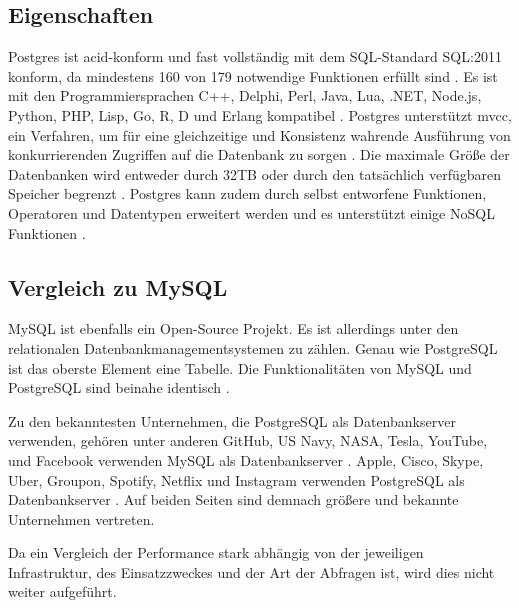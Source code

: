 \subsection{Eigenschaften}
Postgres ist \gls{acid}-konform und fast vollständig mit dem SQL-Standard SQL:2011 konform, da mindestens 160 von 179 notwendige Funktionen erfüllt sind \cite{postgres-about}.
Es ist mit den Programmiersprachen C++, Delphi, Perl, Java, Lua, .NET, Node.js, Python, PHP, Lisp, Go, R, D und Erlang kompatibel \cite{postgres-mysql-comparison}.
Postgres unterstützt \gls{mvcc}, ein Verfahren, um für eine gleichzeitige und Konsistenz wahrende Ausführung von konkurrierenden Zugriffen auf die Datenbank zu sorgen \cite{postgres-about}. Die maximale Größe der Datenbanken wird entweder durch 32TB oder durch den tatsächlich verfügbaren Speicher begrenzt \cite{postgres-about}. Postgres kann zudem durch selbst entworfene Funktionen, Operatoren und Datentypen erweitert werden und es unterstützt einige NoSQL Funktionen \cite{postgres-about}.

\subsection{Vergleich zu MySQL}
MySQL ist ebenfalls ein Open-Source Projekt. Es ist allerdings unter den relationalen Datenbankmanagementsystemen zu zählen. Genau wie PostgreSQL ist das oberste Element eine Tabelle. Die Funktionalitäten von MySQL und PostgreSQL sind beinahe identisch \cite{postgres-mysql-comparison}.

Zu den bekanntesten Unternehmen, die PostgreSQL als Datenbankserver verwenden, gehören unter anderen GitHub, US Navy, NASA, Tesla, YouTube, und Facebook verwenden MySQL als Datenbankserver \cite{mysql-companies}.
Apple, Cisco, Skype, Uber, Groupon, Spotify, Netflix und Instagram verwenden PostgreSQL als Datenbankserver \cite{postgres-companies}.
Auf beiden Seiten sind demnach größere und bekannte Unternehmen vertreten.

Da ein Vergleich der Performance stark abhängig von der jeweiligen Infrastruktur, des Einsatzzweckes und der Art der Abfragen ist, wird dies nicht weiter aufgeführt.

\clearpage

